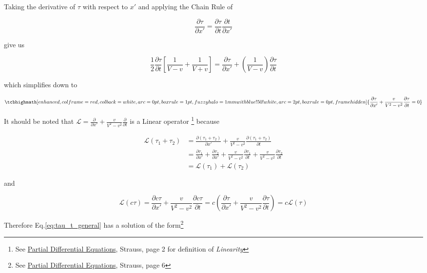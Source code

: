 Taking the derivative of $\tau$ with respect to $x'$ and applying the Chain Rule of

\[
    \frac{\partial\tau}{\partial x'} = \frac{\partial\tau}{\partial t}\frac{\partial t}{\partial x'}
\]

give us

\begin{equation}
    \frac{1}{2}\frac{\partial\tau}{\partial t}\left[ \frac{1}{V - v} + \frac{1}{V + v} \right] = \frac{\partial\tau}{\partial x'} + \left( \frac{1}{V - v} \right)\frac{\partial\tau}{\partial t}
\end{equation}

which simplifies down to

\begin{equation}\label{eq:tau_t_general}
\tcbhighmath[
    enhanced,colframe=red,colback=white,arc=0pt,boxrule=1pt,
    fuzzy halo=1mm with blue!50!white,
    arc=2pt,
    boxrule=0pt,
    frame hidden
]{
    \frac{\partial\tau}{\partial x'} + \frac{v}{V^2 - v^2}\frac{\partial\tau}{\partial t} = 0
}
\end{equation}

It should be noted that $\mathscr{L} = \frac{\partial}{\partial x'} + \frac{v}{V^2 - v^2}\frac{\partial}{\partial t}$
is a Linear operator
\footnote{See \href{https://trello.com/c/5L46ePJQ}{Partial Differential Equations}, Strauss, page 2 for definition of \textit{Linearity}}
because

\begin{align}
    \mathscr{L}(\tau_1 + \tau_2) &= \frac{\partial(\tau_1 + \tau_2)}{\partial x'} + \frac{v}{V^2 - v^2}\frac{\partial(\tau_1 + \tau_2)}{\partial t} \\
    &= \frac{\partial\tau_1}{\partial x'} + \frac{\partial\tau_2}{\partial x'} + \frac{v}{V^2 - v^2}\frac{\partial\tau_1}{\partial t} + \frac{v}{V^2 - v^2}\frac{\partial\tau_2}{\partial t} \\
    &= \mathscr{L}(\tau_1) + \mathscr{L}(\tau_2)
\end{align}

and

\begin{equation}
    \mathscr{L}(c\tau) = \frac{\partial c\tau}{\partial x'} + \frac{v}{V^2 - v^2}\frac{\partial c\tau}{\partial t} = c\left( \frac{\partial\tau}{\partial x'} + \frac{v}{V^2 - v^2}\frac{\partial\tau}{\partial t} \right) = c\mathscr{L}(\tau)
\end{equation}

Therefore Eq.\ref{eq:tau_t_general} has a solution of the form\footnote{See \href{https://trello.com/c/5L46ePJQ}{Partial Differential Equations}, Strauss, page 6}

